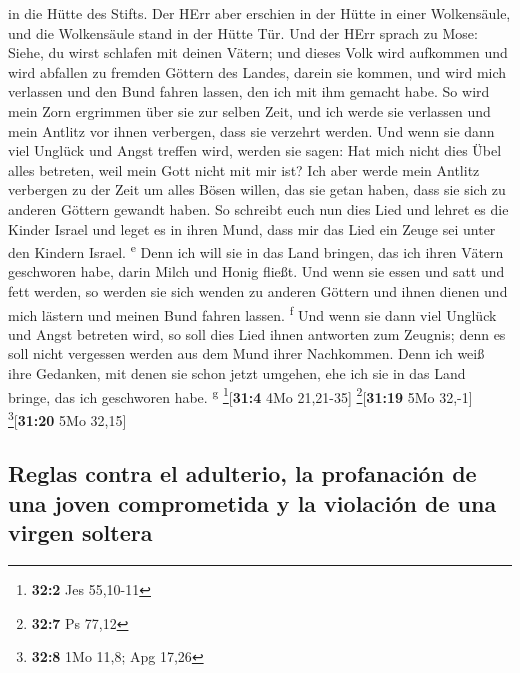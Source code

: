 in die Hütte des Stifts.  Der HErr aber erschien in der
Hütte in einer Wolkensäule, und die Wolkensäule stand in der Hütte Tür.
 Und der HErr sprach zu Mose: Siehe, du wirst schlafen
mit deinen Vätern; und dieses Volk wird aufkommen und wird abfallen zu
fremden Göttern des Landes, darein sie kommen, und wird mich verlassen
und den Bund fahren lassen, den ich mit ihm gemacht habe.
 So wird mein Zorn ergrimmen über sie zur selben Zeit,
und ich werde sie verlassen und mein Antlitz vor ihnen verbergen, dass
sie verzehrt werden. Und wenn sie dann viel Unglück und Angst treffen
wird, werden sie sagen: Hat mich nicht dies Übel alles betreten, weil
mein Gott nicht mit mir ist?  Ich aber werde mein Antlitz
verbergen zu der Zeit um alles Bösen willen, das sie getan haben, dass
sie sich zu anderen Göttern gewandt haben.  So schreibt
euch nun dies Lied und lehret es die Kinder Israel und leget es in ihren
Mund, dass mir das Lied ein Zeuge sei unter den Kindern Israel.
\textsuperscript{e}  Denn ich will sie in das Land
bringen, das ich ihren Vätern geschworen habe, darin Milch und Honig
fließt. Und wenn sie essen und satt und fett werden, so werden sie sich
wenden zu anderen Göttern und ihnen dienen und mich lästern und meinen
Bund fahren lassen. \textsuperscript{f}  Und wenn sie
dann viel Unglück und Angst betreten wird, so soll dies Lied ihnen
antworten zum Zeugnis; denn es soll nicht vergessen werden aus dem Mund
ihrer Nachkommen. Denn ich weiß ihre Gedanken, mit denen sie schon jetzt
umgehen, ehe ich sie in das Land bringe, das ich geschworen habe.
\textsuperscript{g} \footnote{\textbf{32:2} Jes 55,10-11}{[}\textbf{31:4}
4Mo 21,21-35{]} \footnote{\textbf{32:7} Ps 77,12}{[}\textbf{31:19} 5Mo
32,-1{]} \footnote{\textbf{32:8} 1Mo 11,8; Apg 17,26}{[}\textbf{31:20}
5Mo 32,15{]}

\hypertarget{reglas-contra-el-adulterio-la-profanaciuxf3n-de-una-joven-comprometida-y-la-violaciuxf3n-de-una-virgen-soltera}{%
\subsection{Reglas contra el adulterio, la profanación de una joven
comprometida y la violación de una virgen
soltera}\label{reglas-contra-el-adulterio-la-profanaciuxf3n-de-una-joven-comprometida-y-la-violaciuxf3n-de-una-virgen-soltera}}

